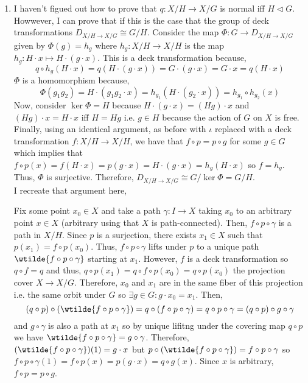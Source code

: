 \documentclass[12pt]{extarticle}
\begin{document}
\begin{enumerate}
\item I haven't figued out how to prove that $q : X/H \to X/G$ is normal iff $H \triangleleft G$. Howwever, I can prove that if this is the case that the group of deck transformations $D_{X/H \to X/G} \cong G/H$. Consider the map $\Phi : G \to D_{X/H \to X/G}$ given by $\Phi(g) = h_g$ where $h_g : X/H \to X/H$ is the map $h_g : H \cdot x \mapsto H \cdot (g \cdot x)$. This is a deck transformation because,
\[q \circ h_g(H \cdot x) = q(H \cdot (g \cdot x)) = G \cdot (g \cdot x) = G \cdot x = q(H \cdot x)\]
$\Phi$ is a homomorphism because, 
\[\Phi(g_1 g_2) = H \cdot (g_1 g_2 \cdot x) = h_{g_1}(H \cdot (g_2 \cdot x)) = h_{g_1} \circ h_{g_2} (x)\]
Now, consider $\ker{\Phi} = H$ because $H \cdot (g \cdot x) = (H g) \cdot x$ and $(Hg) \cdot x = H \cdot x$ iff $H = Hg$ i.e. $g \in H$ because the action of $G$ on $X$ is free. Finally, using an identical argument, as before with $\iota$ replaced with a deck transformation $f : X/H \to X/H$, we have that $f \circ p = p \circ g$ for some $g \in G$ which implies that $f \circ p(x) = f(H \cdot x) = p(g \cdot x) = H \cdot (g \cdot x) = h_g(H \cdot x)$ so $f = h_g$. Thus, $\Phi$ is surjective. Therefore, $D_{X/H \to X/G} \cong G/\ker{\Phi} = G/H$. \bigskip \\ 
I recreate that argument here,
\begin{center}
\end{center}
Fix some point $x_0 \in X$ and take a path $\gamma : I \to X$ taking $x_0$ to an arbitrary point $x \in X$ (arbitrary using that $X$ is path-connected). Then, $f \circ p \circ \gamma$ is a path in $X/H$. Since $p$ is a surjection, there exists $x_1 \in X$ such that $p(x_1) = f \circ p(x_0)$. Thus, $f \circ p \circ \gamma$ lifts under $p$ to a unique path $\wtilde{f \circ p \circ \gamma}$ starting at $x_1$. However, $f$ is a deck transformation so $q \circ f = q$ and thus, $q \circ p(x_1) = q \circ f \circ p(x_0) = q \circ p(x_0)$ the projection cover $X \to X/G$. Therefore, $x_0$ and $x_1$ are in the same fiber of this projection i.e. the same orbit under $G$ so $\exists g \in G : g \cdot x_0 = x_1$. Then,
\[ (q \circ p) \circ (\wtilde{f \circ p \circ \gamma}) = q \circ (f \circ p \circ \gamma) = q \circ p \circ \gamma = (q \circ p) \circ g \circ \gamma \]
and $g \circ \gamma$ is also a path at $x_1$ so by unique lifitng under the covering map $q \circ p$ we have $\wtilde{f \circ p \circ \gamma} = g \circ \gamma$. Therefore, $(\wtilde{f \circ p \circ \gamma})(1) = g \cdot x$ but $p \circ (\wtilde{f \circ p \circ \gamma}) = f \circ p \circ \gamma$ so $f \circ p \circ \gamma(1) = f \circ p(x) = p(g \cdot x) = q \circ g(x)$. Since $x$ is arbitrary, $f \circ p = p \circ g$.



\end{enumerate}   
\end{document}
